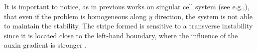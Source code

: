 It is important to notice, as in previous works on singular cell system (see e.g.,\cite{intra2}), that even if the problem is homogeneous along $y$ direction, the system is not able to maintain the stability. The stripe formed is sensitive to a transverse instability since it is located close to the left-hand boundary, where the influence of the auxin gradient is stronger \cite{intra2}.




